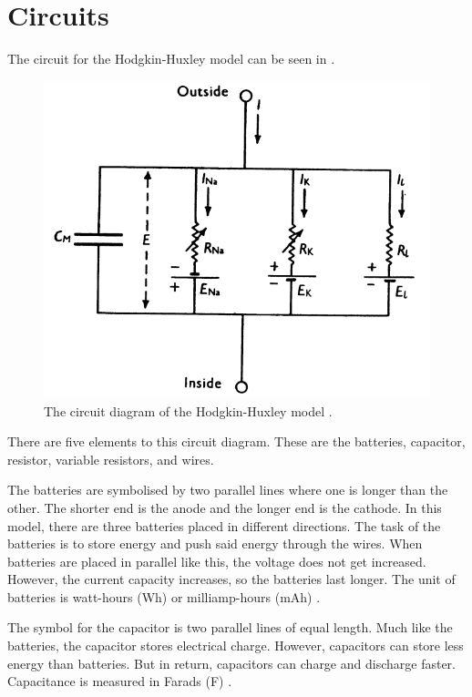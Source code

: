 \documentclass[Orator]{subfiles}
\begin{document}
 
 

\section{Circuits}
The circuit for the Hodgkin-Huxley model can be seen in . 

\begin{figure}[h]
    \centering
    \includegraphics[width=300 pt]{Pictures/Alex/Hodgkin-Huxley model 2.png}
    \caption{The circuit diagram of the Hodgkin-Huxley model \cite{}.}
    \label{fig:HH circuit}
\end{figure}

There are five elements to this circuit diagram. These are the batteries, capacitor, resistor, variable resistors, and wires. 

The batteries are symbolised by two parallel lines where one is longer than the other. The shorter end is the anode and the longer end is the cathode. In this model, there are three batteries placed in different directions. The task of the batteries is to store energy and push said energy through the wires. When batteries are placed in parallel like this, the voltage does not get increased. However, the current capacity increases, so the batteries last longer. The unit of batteries is watt-hours (Wh) or milliamp-hours (mAh) \cite{}. 

The symbol for the capacitor is two parallel lines of equal length. Much like the batteries, the capacitor stores electrical charge. However, capacitors can store less energy than batteries. But in return, capacitors can charge and discharge faster. Capacitance is measured in Farads (\unit{\farad}) \cite{}.
\end{document}
